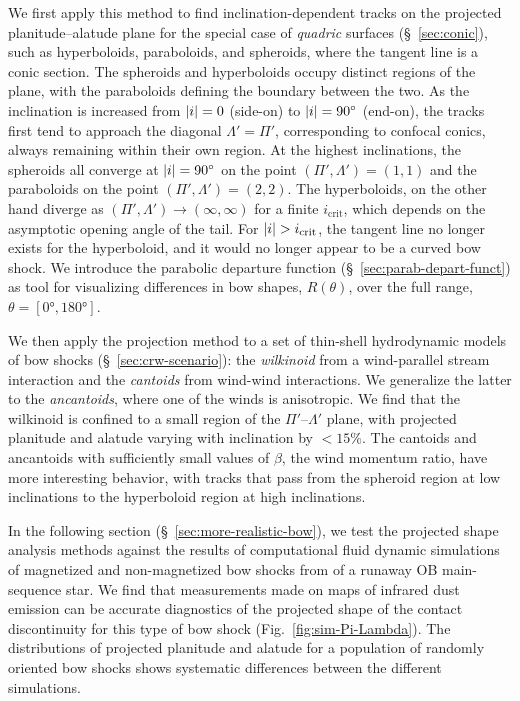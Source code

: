 We first apply this method to find inclination-dependent tracks on the
projected planitude--alatude plane for the special case of
\textit{quadric} surfaces (\S~\ref{sec:conic}), such as hyperboloids,
paraboloids, and spheroids, where the tangent line is a conic section.
The spheroids and hyperboloids occupy distinct regions of the plane,
with the paraboloids defining the boundary between the two.  As the
inclination is increased from \(\lvert i\rvert = 0\) (side-on) to
\(\lvert i\rvert = \ang{90}\) (end-on), the tracks first tend to approach the
diagonal \(\Lambda' = \Pi'\), corresponding to confocal conics, always
remaining within their own region.  At the highest inclinations, the
spheroids all converge at \(\lvert i\rvert = \ang{90}\) on the point
\((\Pi', \Lambda') = (1, 1)\) and the paraboloids on the point
\((\Pi', \Lambda') = (2, 2)\).  The hyperboloids, on the other hand diverge as
\((\Pi', \Lambda') \to (\infty, \infty)\) for a finite
\(i_{\mathrm{crit}}\), which depends on the asymptotic opening angle
of the tail.  For \(\lvert i\rvert > i_{\mathrm{crit}}\), the tangent line no
longer exists for the hyperboloid, and it would no longer appear to be
a curved bow shock.  We introduce the parabolic departure function
(\S~\ref{sec:parab-depart-funct}) as tool for visualizing differences
in bow shapes, \(R(\theta)\), over the full range,
\(\theta = [\ang{0}, \ang{180}]\).

We then apply the projection method to a set of thin-shell
hydrodynamic models of bow shocks (\S~\ref{sec:crw-scenario}): the
\textit{wilkinoid} from a wind-parallel stream interaction and the
\textit{cantoids} from wind-wind interactions.  We generalize the
latter to the \textit{ancantoids}, where one of the winds is
anisotropic.  We find that the wilkinoid is confined to a small region
of the \(\Pi'\)--\(\Lambda'\) plane, with projected planitude and alatude
varying with inclination by \(< 15\%\).  The cantoids and ancantoids
with sufficiently small values of \(\beta\), the wind momentum ratio, have
more interesting behavior, with tracks that pass from the spheroid
region at low inclinations to the hyperboloid region at high
inclinations.

In the following section (\S~\ref{sec:more-realistic-bow}), we test the
projected shape analysis methods against the results of computational
fluid dynamic simulations of magnetized and non-magnetized bow shocks
from \citet{Meyer:2017a} of a runaway OB main-sequence star.  We find
that measurements made on maps of infrared dust emission can be
accurate diagnostics of the projected shape of the contact
discontinuity for this type of bow shock
(Fig.~\ref{fig:sim-Pi-Lambda}).  The distributions of projected
planitude and alatude for a population of randomly oriented bow shocks
shows systematic differences between the different simulations.

